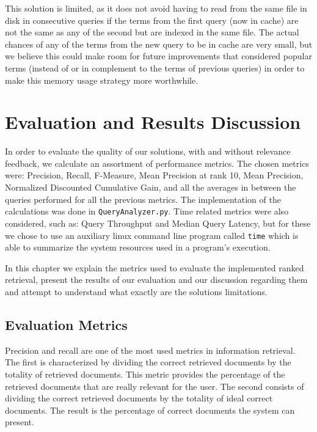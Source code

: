 \documentclass[12pt]{article}
\begin{document}
This solution is limited, as it does not avoid having to read from the same 
file in disk in consecutive queries if the terms from the first query (now in 
cache) are not the same as any of the second but are indexed in the same file.
The actual chances of any of the terms from the new query to be in cache are 
very small, but we believe this could make room for future improvements that 
considered popular terms (instead of or in complement to the terms of previous
queries) in order to make this memory usage strategy more worthwhile.

\newpage
\section{Evaluation and Results Discussion}

In order to evaluate the quality of our solutions, with and without relevance 
feedback, we calculate an assortment of performance metrics.
The chosen metrics were: Precision, Recall, F-Measure, Mean Precision at rank 10, 
Mean Precision, Normalized Discounted Cumulative Gain, and all the averages in 
between the queries performed for all the previous metrics.
The implementation of the calculations was done in \texttt{QueryAnalyzer.py}.
Time related metrics were also considered, such as: Query Throughput and Median 
Query Latency, but for these we chose to use an auxiliary linux command line 
program called \texttt{time} which is able to summarize the system resources 
used in a program's execution.

In this chapter we explain the metrics used to evaluate the implemented ranked
retrieval, present the results of our evaluation and our discussion regarding 
them and attempt to understand what exactly are the solutions limitations.

\subsection{Evaluation Metrics} \label{metrics}

Precision and recall are one of the most used metrics in information retrieval.
The first is characterized by dividing the correct retrieved documents by the 
totality of retrieved documents. 
This metric provides the percentage of the retrieved documents that are really 
relevant for the user.
The second consists of dividing the correct retrieved documents by the totality 
of ideal correct documents. 
The result is the percentage of correct documents the system can present.
\end{document}
